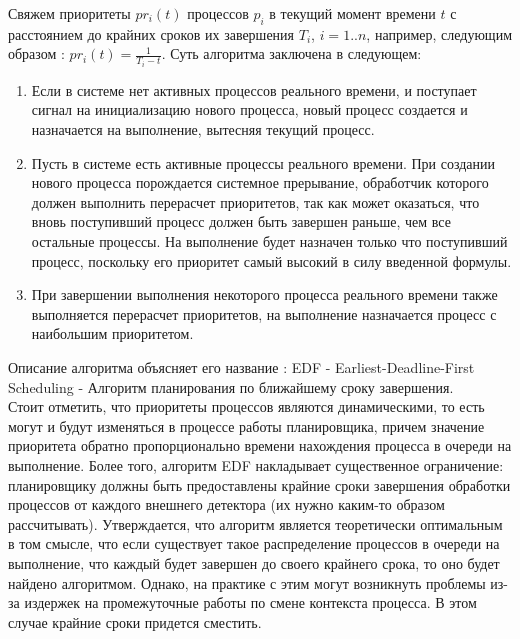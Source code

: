 Свяжем приоритеты $pr_i(t)$ процессов $p_i$ в текущий момент времени $t$ с расстоянием до крайних сроков их завершения $T_i$, $i = 1..n$, например, следующим образом : $pr_i(t) = \frac{1}{T_i - t}$. Суть алгоритма заключена в следующем:\\
\begin{enumerate}[label=---]
\item Если в системе нет активных процессов реального времени, и поступает сигнал на инициализацию нового процесса, новый процесс создается и назначается на выполнение, вытесняя текущий процесс.
\item Пусть в системе есть активные процессы реального времени. При создании нового процесса порождается системное прерывание, обработчик которого должен выполнить перерасчет приоритетов, так как может оказаться, что вновь поступивший процесс должен быть завершен раньше, чем все остальные процессы. На выполнение будет назначен только что поступивший процесс, поскольку его приоритет самый высокий в силу введенной формулы.
\item При завершении выполнения некоторого процесса реального времени также выполняется перерасчет приоритетов, на выполнение назначается процесс с наибольшим приоритетом.
\end{enumerate}

Описание алгоритма объясняет его название \cite{rt}: EDF - Earliest-Deadline-First Scheduling - Алгоритм планирования по ближайшему сроку завершения.\\
Стоит отметить, что приоритеты процессов являются динамическими, то есть могут и будут изменяться в процессе работы планировщика, причем значение приоритета обратно пропорционально времени нахождения процесса в очереди на выполнение. Более того, алгоритм EDF накладывает существенное ограничение: планировщику должны быть предоставлены крайние сроки завершения обработки процессов от каждого внешнего детектора (их нужно каким-то образом рассчитывать). Утверждается, что алгоритм является теоретически оптимальным в том смысле, что если существует такое распределение процессов в очереди на выполнение, что каждый будет завершен до своего крайнего срока, то оно будет найдено алгоритмом. Однако, на практике с этим могут возникнуть проблемы из-за издержек на промежуточные работы по смене контекста процесса. В этом случае крайние сроки придется сместить.